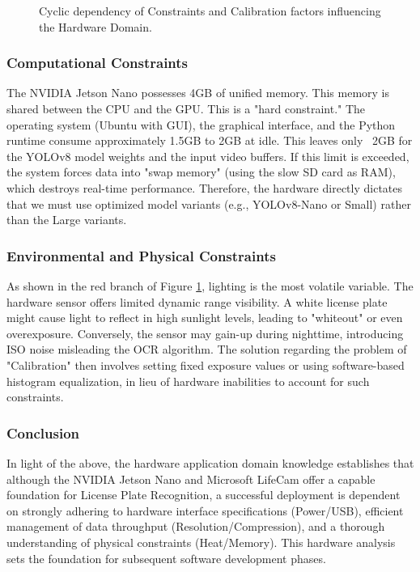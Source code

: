 \begin{figure}[h!]
	\centering
	
	\caption{Cyclic dependency of Constraints and Calibration factors influencing the Hardware Domain.}
	\label{fig:hardware_constraints}
\end{figure}

\subsubsection{Computational Constraints}
The NVIDIA Jetson Nano possesses 4GB of unified memory. This memory is shared between the CPU and the GPU. This is a "hard constraint." The operating system (Ubuntu with GUI), the graphical interface, and the Python runtime consume approximately 1.5GB to 2GB at idle. This leaves only ~2GB for the YOLOv8 model weights and the input video buffers. If this limit is exceeded, the system forces data into "swap memory" (using the slow SD card as RAM), which destroys real-time performance. Therefore, the hardware directly dictates that we must use optimized model variants (e.g., YOLOv8-Nano or Small) rather than the Large variants.

\subsubsection{Environmental and Physical Constraints}
As shown in the red branch of Figure \ref{fig:hardware_constraints}, lighting is the most volatile variable. The hardware sensor offers limited dynamic range visibility. A white license plate might cause light to reflect in high sunlight levels, leading to "whiteout" or even overexposure. Conversely, the sensor may gain-up during nighttime, introducing ISO noise misleading the OCR algorithm. The solution regarding the problem of "Calibration" then involves setting fixed exposure values or using software-based histogram equalization, in lieu of hardware inabilities to account for such constraints.

\subsubsection{Conclusion}
In light of the above, the hardware application domain knowledge  establishes that although the NVIDIA Jetson Nano and Microsoft LifeCam offer a capable foundation for License Plate Recognition, a successful deployment is dependent on strongly adhering to hardware interface specifications (Power/USB), efficient management of data throughput (Resolution/Compression), and a thorough understanding of physical constraints (Heat/Memory). This hardware analysis sets the foundation for subsequent software development phases.